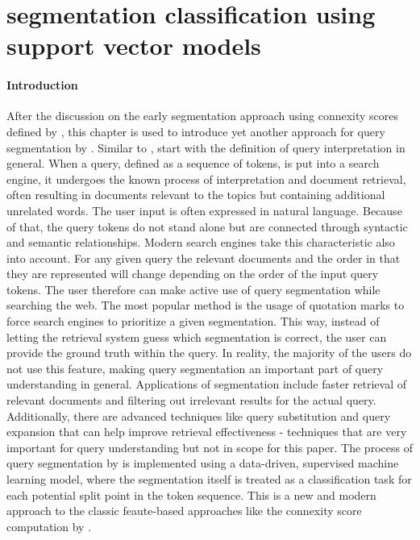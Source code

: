 \section{segmentation classification using support vector models} \label{approach2}

\paragraph*{Introduction}
After the discussion on the early segmentation approach using connexity scores defined by \citeauthor{Risvik:2003}, this chapter is used to introduce yet another approach for query segmentation by \citeauthor{Bergsma:2007}. Similar to \citeauthor{Risvik:2003}, \citeauthor{Bergsma:2007} start with the definition of query interpretation in general. When a query, defined as a sequence of tokens, is put into a search engine, it undergoes the known process of interpretation and document retrieval, often resulting in documents relevant to the topics but containing additional unrelated words. The user input is often expressed in natural language. Because of that, the query tokens do not stand alone but are connected through syntactic and semantic relationships. Modern search engines take this characteristic also into account. For any given query the relevant documents and the order in that they are represented will change depending on the order of the input query tokens. The user therefore can make active use of query segmentation while searching the web. The most popular method is the usage of quotation marks to force search engines to prioritize a given segmentation. This way, instead of letting the retrieval system guess which segmentation is correct, the user can provide the ground truth within the query. In reality, the majority of the users do not use this feature, making query segmentation an important part of query understanding in general. Applications of segmentation include faster retrieval of relevant documents and filtering out irrelevant results for the actual query. Additionally, there are advanced techniques like query substitution and query expansion that can help improve retrieval effectiveness - techniques that are very important for query understanding but not in scope for this paper. The process of query segmentation by \citeauthor{Bergsma:2007} is implemented using a data-driven, supervised machine learning model, where the segmentation itself is treated as a classification task for each potential split point in the token sequence. This is a new and modern approach to the classic feaute-based approaches like the connexity score computation by \citet{Risvik:2003}.

